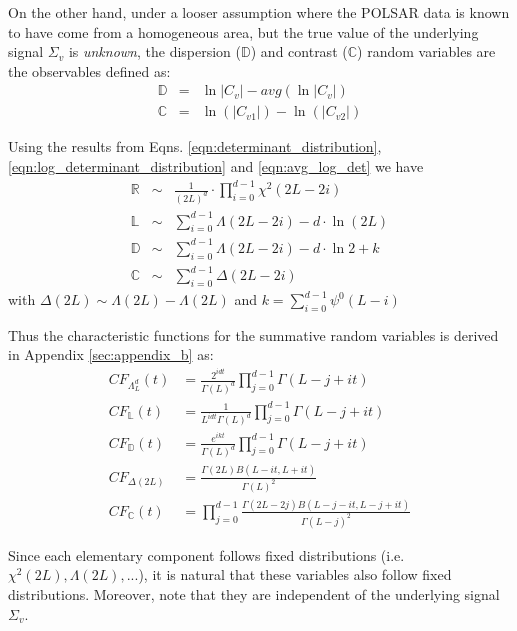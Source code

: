 \documentclass[journal,12pt,draftcls,onecolumn]{IEEEtran}
\begin{document}
On the other hand, under a looser assumption %
  where the POLSAR data is known to have come from a homogeneous area, but the true value of the underlying signal $\Sigma_v$ is \textit{unknown},
  the dispersion ($\mathbb{D}$) and contrast ($\mathbb{C}$) random variables are the observables defined as:
\begin{eqnarray}
  \mathbb{D} &=& \ln{|C_v|} - avg(\ln{|C_v|}) \label{eqn:dispersion_observable}\\
  \mathbb{C} &=& \ln(|C_{v1}|) - \ln(|C_{v2}|) \label{eqn:contrast_observable}
\end{eqnarray}

Using the results from Eqns. \ref{eqn:determinant_distribution}, \ref{eqn:log_determinant_distribution} and \ref{eqn:avg_log_det} we have
\begin{eqnarray}
\mathbb{R} &\sim& \frac{1}{(2L)^d} \cdot \prod_{i=0}^{d-1} \chi^2 (2L-2i) \label{eqn:determinant_ratio_distribution} \\
\mathbb{L} &\sim&  \sum^{d-1}_{i=0} \Lambda(2L-2i) - d \cdot \ln(2L)
\label{eqn:log_determinant_distance_distribution} \\ 
 \mathbb{D} &\sim& \sum^{d-1}_{i=0} \Lambda(2L-2i) - d \cdot \ln{2} + k
\label{eqn:dispersion_distribution} \\ 
 \mathbb{C} &\sim& \sum^{d-1}_{i=0} \Delta(2L-2i)
\label{eqn:contrast_distribution}  
\end{eqnarray}
with $\Delta(2L) \sim \Lambda(2L) - \Lambda(2L)$
and $k=\sum^{d-1}_{i=0} \psi^0(L-i)$

Thus the characteristic functions for the summative random variables is derived in Appendix \ref{sec:appendix_b} as:
\begin{align}
  CF_{\Lambda^d_L}(t) &= \frac{2^{idt}}{\Gamma(L)^d} \prod^{d-1}_{j=0} \Gamma(L-j+it) \\
  CF_{\mathbb{L}}(t) &= \frac{1}{L^{idt} \Gamma(L)^d} \prod^{d-1}_{j=0} \Gamma(L-j+it) \\
  CF_{\mathbb{D}}(t) &= \frac{e^{ikt}}{\Gamma(L)^d} \prod^{d-1}_{j=0} \Gamma(L-j+it) \\
  CF_{\Delta(2L)} &= \frac{\Gamma(2L) B(L-it,L+it)}{\Gamma(L)^2} \\
  CF_{\mathbb{C}}(t) &=  \prod^{d-1}_{j=0} \frac{\Gamma(2L-2j) B(L-j-it,L-j+it)}{\Gamma(L-j)^2}
\end{align}

Since each elementary component follows fixed distributions (i.e. $\chi^2(2L), \Lambda(2L), ... $),
  it is natural that these variables also follow fixed distributions.
Moreover, note that they are independent of the underlying signal $\Sigma_v$.
\end{document}
